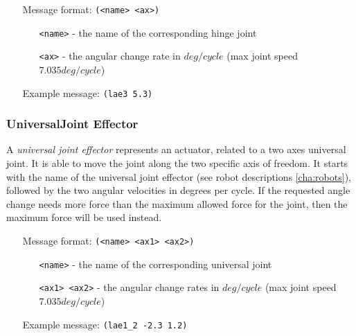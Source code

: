\begin{itemize}
	\item[Message format:] \texttt{(<name> <ax>)}
		\begin{itemize}
		  \item[\texttt{<name>} -] the name of the corresponding hinge joint
		  \item[\texttt{<ax>} -] the angular change rate in $deg/cycle$ (max joint
		  speed $7.035 deg/cycle$)
		\end{itemize}
	\item[Example message:] \texttt{(lae3 5.3)}
\end{itemize}



\subsubsection{UniversalJoint Effector}
\label{sec:UJE}
A \emph{universal joint effector} represents an actuator, related to a two axes
universal joint. It is able to move the joint along the two specific axis of
freedom. It starts with the name of the universal joint effector (see robot
descriptions \ref{cha:robots}), followed by the two angular velocities in
degrees per cycle. If the requested angle change needs more force than the
maximum allowed force for the joint, then the maximum force will be used
instead.

\begin{itemize}
	\item[Message format:] \texttt{(<name> <ax1> <ax2>)}
		\begin{itemize}
		  \item[\texttt{<name>} -] the name of the corresponding universal joint
		  \item[\texttt{<ax1> <ax2>} -] the angular change rates in $deg/cycle$ (max joint
		  speed $7.035 deg/cycle$) 
		\end{itemize}
	\item[Example message:] \texttt{(lae1\_2 -2.3 1.2)}
\end{itemize}






